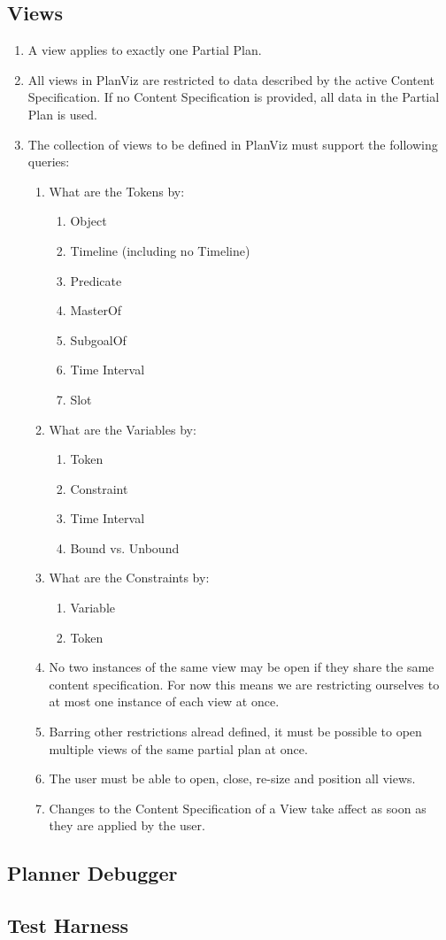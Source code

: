 \documentclass[twoside, 11pt]{article}
\begin{document}
\subsection{Views}
\begin{enumerate}
\item A view applies to exactly one Partial Plan.
\item All views in PlanViz are restricted to data described by the active Content Specification. If no Content Specification is provided, all data in the Partial Plan is used.
\item The collection of views to be defined in PlanViz must support the following queries:
\begin{enumerate}
\item What are the Tokens by:
\begin{enumerate}
\item Object
\item Timeline (including no Timeline)
\item Predicate
\item MasterOf
\item SubgoalOf
\item Time Interval
\item Slot
\end{enumerate}
\item What are the Variables by:
\begin{enumerate}
\item Token
\item Constraint
\item Time Interval
\item Bound vs. Unbound
\end{enumerate}
\item What are the Constraints by:
\begin{enumerate}
\item Variable
\item Token
\end{enumerate}
\item No two instances of the same view may be open if they share the same content specification. For now this means we are restricting ourselves to at most one instance of each view at once.
\item Barring other restrictions alread defined, it must be possible to open multiple views of the same partial plan at once.
\item The user must be able to open, close, re-size and position all views.
\item Changes to the Content Specification of a View take affect as soon as they are applied by the user.
\end{enumerate}
\end{enumerate}
\subsection{Planner Debugger}
\subsection{Test Harness}
\end{document}
